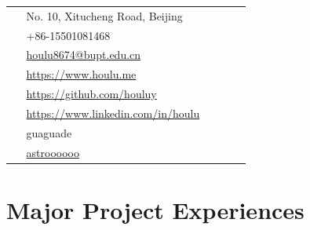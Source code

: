 \documentclass[10pt]{article} %
\begin{document}
\begin{paracol}{2}
\parbox[top][0.12\textheight][c]{\linewidth}{ %
	\vspace{-0.04\textheight} %
	\colorbox{shade}{ %
		\begin{supertabular}{p{0.05\linewidth}|p{0.775\linewidth}} %
			\raisebox{-1pt}{\faHome} & No. 10, Xitucheng Road, Beijing \\ %
			\raisebox{-1pt}{\faPhone} & +86-15501081468 \\ %
			\raisebox{0pt}{\small\faEnvelope} & \href{mailto:houlu8674@bupt.edu.cn}{houlu8674@bupt.edu.cn} \\ %
			\raisebox{-1pt}{\small\faDesktop} & \href{https://www.houlu.me}{https://www.houlu.me} \\ %
			\raisebox{-1pt}{\faGithub} & \href{https://github.com/houluy}{https://github.com/houluy} \\ %
			\raisebox{-1pt}{\faLinkedinSquare} & \href{https://www.linkedin.com/in/username}{https://www.linkedin.com/in/houlu} \\ %
			\raisebox{-1pt}{\faWechat} &
			guaguade\\
			\raisebox{-1pt}{\faWeibo} &
			\href{http://weibo.com/lucima}{astroooooo}\\
		\end{supertabular}
	}
}

\section{Major Project Experiences}






\end{paracol}
\end{document}
